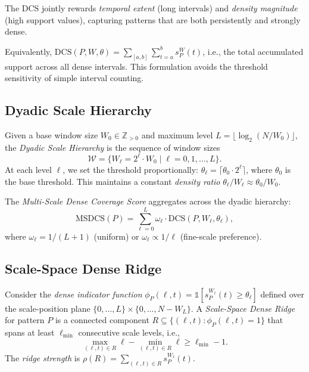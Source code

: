 The DCS jointly rewards \emph{temporal extent} (long intervals) and
\emph{density magnitude} (high support values), capturing
patterns that are both persistently and strongly dense.

\begin{remark}
Equivalently, $\mathrm{DCS}(P, W, \theta) = \sum_{[a,b]} \sum_{t=a}^{b} s_P^W(t)$,
i.e., the total accumulated support across all dense intervals.
This formulation avoids the threshold sensitivity of simple interval counting.
\end{remark}

\subsection{Dyadic Scale Hierarchy}

\begin{definition}\label{def:dyadic}
Given a base window size $W_0 \in \mathbb{Z}_{>0}$ and maximum level
$L = \lfloor \log_2(N / W_0) \rfloor$, the \emph{Dyadic Scale Hierarchy}
is the sequence of window sizes
\begin{equation}
\mathcal{W} = \{W_\ell = 2^\ell \cdot W_0 \mid \ell = 0, 1, \ldots, L\}.
\end{equation}
At each level $\ell$, we set the threshold proportionally:
$\theta_\ell = \lceil \theta_0 \cdot 2^\ell \rceil$,
where $\theta_0$ is the base threshold.
This maintains a constant \emph{density ratio} $\theta_\ell / W_\ell \approx \theta_0 / W_0$.
\end{definition}

\begin{definition}\label{def:ms_dcs}
The \emph{Multi-Scale Dense Coverage Score} aggregates across the dyadic hierarchy:
\begin{equation}
\mathrm{MSDCS}(P) = \sum_{\ell=0}^{L} \omega_\ell \cdot \mathrm{DCS}(P, W_\ell, \theta_\ell),
\end{equation}
where $\omega_\ell = 1 / (L+1)$ (uniform) or $\omega_\ell \propto 1/\ell$
(fine-scale preference).
\end{definition}

\subsection{Scale-Space Dense Ridge}

\begin{definition}\label{def:ridge}
Consider the \emph{dense indicator function}
$\phi_P(\ell, t) = \mathbb{1}[s_P^{W_\ell}(t) \geq \theta_\ell]$
defined over the scale-position plane $\{0,\ldots,L\} \times \{0,\ldots,N-W_L\}$.
A \emph{Scale-Space Dense Ridge} for pattern $P$ is a connected component
$R \subseteq \{(\ell, t) : \phi_P(\ell, t) = 1\}$ that spans at least
$\ell_{\min}$ consecutive scale levels, i.e.,
\begin{equation}
\max_{(\ell,t) \in R} \ell - \min_{(\ell,t) \in R} \ell \geq \ell_{\min} - 1.
\end{equation}
The \emph{ridge strength} is $\rho(R) = \sum_{(\ell,t) \in R} s_P^{W_\ell}(t)$.
\end{definition}

